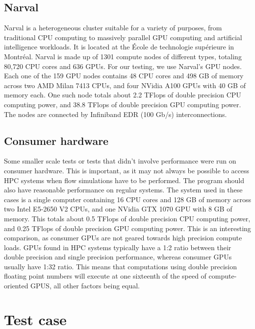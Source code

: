 \subsection{Narval} \label{section:results:platforms:narval}

Narval is a heterogeneous cluster suitable for a variety of purposes, from traditional CPU computing
to massively parallel GPU computing and artificial intelligence workloads. It is located at the
École de technologie supérieure in Montréal. Narval is made up of 1301 compute nodes of different
types, totaling 80,720 CPU cores and 636 GPUs. For our testing, we use Narval's GPU nodes. Each one
of the 159 GPU nodes contains 48 CPU cores and 498 GB of memory across two AMD Milan 7413 CPUs, and
four NVidia A100 GPUs with 40 GB of memory each. One such node totals about 2.2 TFlops of double
precision CPU computing power, and 38.8 TFlops of double precision GPU computing power. The nodes
are connected by Infiniband EDR (100 Gb/s) interconnections.

\subsection{Consumer hardware} \label{section:results:platforms:consumer}

Some smaller scale tests or tests that didn't involve performance were run on consumer hardware.
This is important, as it may not always be possible to access HPC systems when flow simulations have
to be performed. The program should also have reasonable performance on regular systems. The system
used in these cases is a single computer containing 16 CPU cores and 128 GB of memory across two
Intel E5-2650 V2 CPUs, and one NVidia GTX 1070 GPU with 8 GB of memory. This totals about 0.5 TFlops
of double precision CPU computing power, and 0.25 TFlops of double precision GPU computing power.
This is an interesting comparison, as consumer GPUs are not geared towards high precision compute
loads. GPUs found in HPC systems typically have a 1:2 ratio between their double precision and
single precision performance, whereas consumer GPUs usually have 1:32 ratio. This means that
computations using double precision floating point numbers will execute at one sixteenth of the
speed of compute-oriented GPUS, all other factors being equal.

\section{Test case} \label{section:results:test_case}

